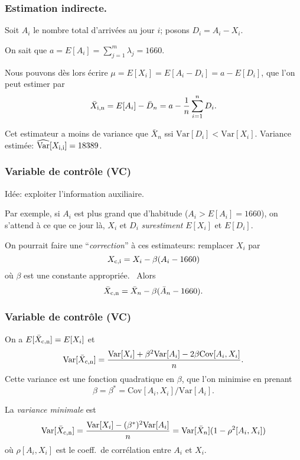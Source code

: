 \documentclass[t,usepdftitle=false]{beamer}
\def\Var{\mbox{Var}}
\def\Cov{\mbox{Cov}}
\begin{document}
\begin{frame}
\frametitle{Estimation indirecte.}

Soit ${A_i}$ le nombre total d'arrivées au jour $i$; posons ${D_i} = A_i - X_i$.

\mbox{}

On sait que ${a} = E[A_i] = \sum_{j=1}^m \lambda_j = 1660$.

\mbox{}

Nous pouvons dès lors écrire $\mu = E[X_i] = E[A_i - D_i] = a - E[D_i]$, que 
l'on peut estimer par
 $$ {\bar X_{\rm{i},n}} = E[A_i] - \bar D_n = a - {1\over n} \sum_{i=1}^n D_i.$$

\mbox{}

Cet estimateur a moins de variance que $\bar X_n$ ssi $\Var[D_i] < \Var[X_i]$. 
Variance estimée: $\widehat{\Var}[X_{\rm{i},i}] = {18389}$.

\end{frame}

\begin{frame}
\frametitle{Variable de contrôle (VC)}

Idée: exploiter l'information auxiliaire.

\mbox{}

Par exemple, si ${A_i}$ est plus grand que d'habitude ($A_i > E[A_i] = 1660$),
on s'attend \`a ce que ce jour l\`a, $X_i$ et $D_i$
\emph{surestiment} $E[X_i]$ et $E[D_i]$.

\mbox{}

On pourrait faire une ``\emph{correction}'' \`a ces estimateurs:
remplacer $X_i$ par
 $$ X_{\rm{c},i} = X_i - {\beta} (A_i - 1660) $$
o\`u $\beta$ est une constante appropriée.  \ Alors
\[
 {\bar X_{\rm{c},n}} = \bar X_n - \beta (\bar A_n - 1660).
\]

\end{frame}

\begin{frame}
\frametitle{Variable de contrôle (VC)}

On a $E[\bar X_{\rm{c},n}] = E[X_i]$ et 
 $$ \Var[\bar X_{\rm{c},n}] 
    = \frac{\Var[X_i] + \beta^2\Var[A_i] - 2 \beta\Cov[A_i,X_i]}{n}. $$ 
Cette variance est une fonction quadratique en $\beta$, que l'on minimise
en prenant
\[
  \beta = {\beta^*} = \Cov[A_i, X_i] / \Var[A_i].
\]

\mbox{}

La \emph{variance minimale} est
 $$ \Var[\bar X_{\rm{c},n}] = \frac{\Var[X_i] - (\beta^*)^2 \Var[A_i]}{n}
      = \Var[\bar X_n] (1- \rho^2[A_i,X_i]) $$
o\`u ${\rho[A_i, X_i]}$ est le coeff.\ de corrélation entre 
$A_i$ et $X_i$.

\end{frame}
\end{document}
